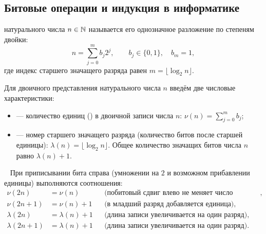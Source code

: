 \subsection{Битовые операции и индукция в информатике}

\begin{definition}
     натурального числа 
    $n \in \mathbb{N}$ называется его однозначное разложение по степеням двойки:
    \begin{equation} \label{eq:bin_rep}
        n = \sum_{j=0}^{m} b_j 2^j, \qquad b_j \in \{0, 1\}, \quad b_m = 1, 
        \tag{8}
    \end{equation}
    где индекс старшего значащего разряда равен $m = \lfloor \log_2 n \rfloor$.
\end{definition}

\begin{designation}
    Для двоичного представления натурального числа $n$ введём две 
    числовые характеристики:
    \begin{itemize}
        \item {} --- количество единиц () в двоичной записи числа $n$: $\nu(n) = \sum_{j=0}^m b_j$;
        \item {} --- номер старшего значащего разряда 
        (количество битов после старшей единицы): 
        $\lambda(n) = \lfloor \log_2 n \rfloor$. Общее количество значащих 
        битов числа $n$ равно $\lambda(n) + 1$.
    \end{itemize}
\end{designation}

\begin{properties} ~
    При приписывании бита справа (умножении на $2$ и возможном прибавлении 
    единицы) выполняются соотношения:
    \begin{align*}
        \nu(2n) &= \nu(n) 
        &&\text{(побитовый сдвиг влево не меняет число единиц)}, \\
        \nu(2n + 1) &= \nu(n) + 1 
        &&\text{(в младший разряд добавляется единица)}, \\
        \lambda(2n) &= \lambda(n) + 1 
        &&\text{(длина записи увеличивается на один разряд)}, \\
        \lambda(2n + 1) &= \lambda(n) + 1 
        &&\text{(длина записи увеличивается на один разряд)}.
    \end{align*}
\end{properties}


